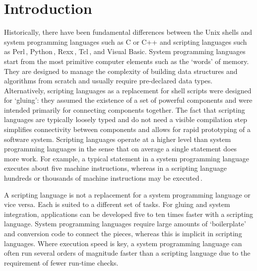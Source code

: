 \documentclass[12pt]{article}
\begin{document}

\section{Introduction}

Historically, there have been fundamental differences between the Unix
shells and system programming languages such as C or C++ and
scripting languages such as
Perl\,\cite{wall99:_perl_progr_refer_guide},
Python\,\cite{martelli06:_python_nutsh},
Rexx\,\cite{o'hara88:_moder_progr_using_rexx},
Tcl\,\cite{ousterhout94:_tcl_tk_toolk}, and Visual Basic.  System
programming languages start from the most primitive computer elements
such as the `words' of memory. They are designed to manage the complexity of
building data structures and algorithms from scratch and usually
require pre-declared data types.  Alternatively, scripting languages
as a replacement for shell scripts were designed for `gluing': they
assumed the existence of a set of powerful components and were
intended primarily for connecting components together. The fact that
scripting languages are typically loosely typed and do not need a
visible compilation step simplifies connectivity between components
and allows for rapid prototyping of a software system.
Scripting languages operate at a higher level than system programming
languages in the sense that on average a single statement does more
work. For example, a typical statement in a system programming
language executes about five machine instructions, whereas in a
scripting language hundreds or thousands of machine instructions may
be executed\,\cite{ousterhout98:_scrip}.


A scripting language is not a replacement for a system programming
language or vice versa. Each is suited to a different set of tasks.
For gluing and system integration, applications can be developed
five to ten times faster with a scripting language. System programming languages
require large amounts of `boilerplate' and conversion code to connect
the pieces, whereas this is implicit in scripting languages. Where
execution speed is key, a system programming language can often run
several orders of magnitude faster than a scripting language due to the requirement of
fewer run-time checks.
\end{document}
